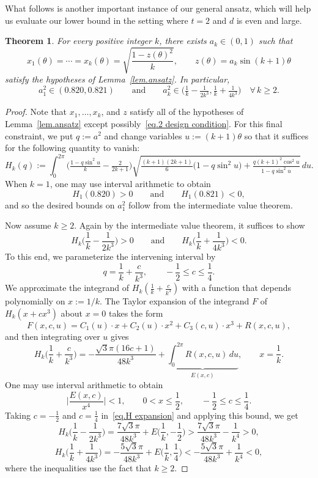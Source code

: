 \documentclass[12pt]{article}
\theoremstyle{plain}
\newtheorem{thm}{Theorem}
\theoremstyle{definition}
\theoremstyle{remark}
\begin{document}
What follows is another important instance of our general ansatz, which will help us evaluate our lower bound in the setting where $t=2$ and $d$ is even and large.

\begin{thm}
\label{thm.sine ansatz}
For every positive integer $k$, there exists $a_k\in(0,1)$ such that
\[
x_1(\theta)
=\cdots
=x_k(\theta)
=\sqrt{\frac{1-z(\theta)^2}{k}},
\qquad
z(\theta)=a_k\sin(k+1)\theta
\]
satisfy the hypotheses of Lemma~\ref{lem.ansatz}.
In particular, 
\[
a_1^2\in(0.820,0.821)
\qquad\text{and}\qquad
a_k^2\in\big(\tfrac{1}{k}-\tfrac{1}{2k^3},\tfrac{1}{k}+\tfrac{1}{4k^3}\big)
\quad
\forall\,k\geq2.
\]
\end{thm}

\begin{proof}
Note that $x_1,\ldots,x_k$, and $z$ satisfy all of the hypotheses of Lemma~\ref{lem.ansatz} except possibly~\eqref{eq.2 design condition}.
For this final constraint, we put $q:=a^2$ and change variables $u:=(k+1)\theta$ so that it suffices for the following quantity to vanish:
\[
H_k(q)
:=
\int_0^{2\pi}
\big(
\tfrac{1-q\sin^2u}{k}
-\tfrac{2}{2k+1}
\big)
\sqrt{
\tfrac{(k+1)(2k+1)}{6}\big(1-q\sin^2u\big)
+\tfrac{q(k+1)^2\cos^2u}{1-q\sin^2u}
}\,du.
\]
When $k=1$, one may use interval arithmetic to obtain
\[
H_1(0.820)>0
\qquad\text{and}\qquad
H_1(0.821)<0,
\]
and so the desired bounds on $a_1^2$ follow from the intermediate value theorem.

Now assume $k\geq 2$.
Again by the intermediate value theorem, it suffices to show
\[
H_k\bigg(\frac{1}{k}-\frac{1}{2k^3}\bigg)>0
\qquad\text{and}\qquad
H_k\bigg(\frac{1}{k}+\frac{1}{4k^3}\bigg)<0.
\]
To this end, we parameterize the intervening interval by
\[
q=\frac{1}{k}+\frac{c}{k^3},
\qquad
-\frac{1}{2}\leq c\leq \frac{1}{4}.
\]
We approximate the integrand of $H_k(\frac{1}{k}+\frac{c}{k^3})$ with a function that depends polynomially on $x:=1/k$.
The Taylor expansion of the integrand $F$ of $H_k(x+cx^3)$ about $x=0$ takes the form
\[
F(x,c,u)
=
C_1(u)\cdot x+C_2(u)\cdot x^2+C_3(c,u)\cdot x^3+R(x,c,u),
\]
and then integrating over $u$ gives
\begin{equation}
\label{eq.H expansion}
H_k\bigg(\frac1k+\frac{c}{k^3}\bigg)
=
-\frac{\sqrt3\pi(16c+1)}{48k^3}
+\underbrace{\int_0^{2\pi}
R(x,c,u)
\,du
}_{E(x,c)},
\qquad
x=\frac{1}{k}.
\end{equation}
One may use interval arithmetic to obtain
\[
\bigg|\frac{E(x,c)}{x^4}\bigg|
<1,
\qquad
0<x\leq\frac{1}{2},
\qquad
-\frac{1}{2}\leq c\leq\frac{1}{4}.
\]
Taking $c=-\frac{1}{2}$ and $c=\frac{1}{4}$ in~\eqref{eq.H expansion} and applying this bound, we get
\[
H_k\bigg(\frac{1}{k}-\frac{1}{2k^3}\bigg)
=\frac{7\sqrt{3}\pi}{48k^3}
+E\bigg(\frac{1}{k},-\frac{1}{2}\bigg)
>\frac{7\sqrt{3}\pi}{48k^3}
-\frac{1}{k^4}
>0,
\]
\[
H_k\bigg(\frac{1}{k}+\frac{1}{4k^3}\bigg)
=-\frac{5\sqrt{3}\pi}{48k^3}
+E\bigg(\frac{1}{k},\frac{1}{4}\bigg)
<-\frac{5\sqrt{3}\pi}{48k^3}+\frac{1}{k^4}
<0,
\]
where the inequalities use the fact that $k\geq 2$.
\end{proof}
\end{document}
